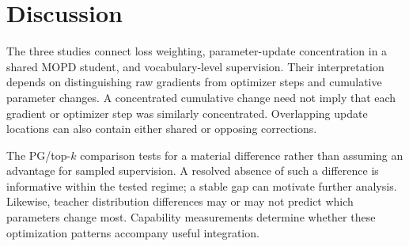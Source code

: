 \section{Discussion}
\label{sec:conclusion}

The three studies connect loss weighting, parameter-update concentration in a
shared MOPD student, and vocabulary-level supervision. Their interpretation
depends on distinguishing raw gradients from optimizer steps and
cumulative parameter changes. A concentrated cumulative change need not imply that each gradient or
optimizer step was similarly concentrated. Overlapping update locations
can also contain either shared or opposing corrections.

The PG/top-$k$ comparison tests for a material difference rather than
assuming an advantage for sampled supervision. A resolved absence of
such a difference is informative within the tested regime; a stable
gap can motivate further analysis. Likewise, teacher distribution
differences may or may not predict which parameters change most. Capability measurements determine whether these optimization
patterns accompany useful integration.

